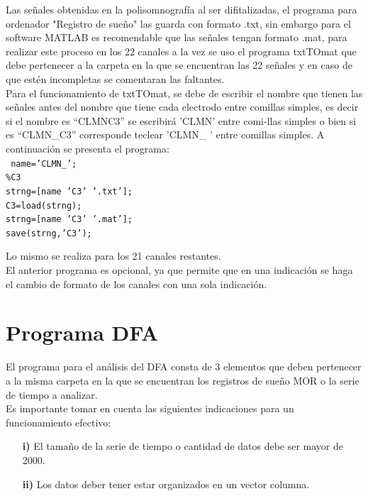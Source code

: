 \documentclass[letterpaper,titlepage,12pt,draft]{report}
\begin{document}
Las se\~nales obtenidas en la polisomnograf\'ia al ser difitalizadas, el programa para ordenador "Registro de sue\~no" las guarda con formato .txt, sin embargo para el software MATLAB es recomendable que las se\~nales tengan formato .mat, para realizar este proceso en los 22 canales a la vez se uso el programa txtTOmat que debe pertenecer a la carpeta en la que se encuentran las 22 se\~nales y en caso de que est\'en incompletas se comentaran las faltantes.\\

Para el funcionamiento de txtTOmat, se debe de escribir el nombre que tienen las se\~nales antes del nombre que tiene cada electrodo entre comillas simples, es decir si el nombre es ``CLMNC3'' se escribir\'a 'CLMN' entre comi-llas simples o bien si es ``CLMN\_C3'' corresponde teclear 'CLMN\_ ' entre comillas simples. A continuaci\'on se presenta el programa:\\

{\tt
\setlength{\parindent}{0pt}name=\textcolor[cmyk]{0,1,0,0}{'CLMN\_'};\\
\%C3\\
strng=[name \textcolor[cmyk]{0,1,0,0}{'C3' '.txt'}];\\
C3=load(strng);\\
strng=[name \textcolor[cmyk]{0,1,0,0}{'C3' '.mat'}];\\
save(strng,\textcolor[cmyk]{0,1,0,0}{'C3'});\\
}

Lo mismo se realiza para los 21 canales restantes.\\

El anterior programa es opcional, ya que permite que en una indicaci\'on se haga el cambio de formato de los canales con una sola indicaci\'on. 

\section{Programa DFA}

El programa para el an\'alisis del DFA consta de 3 elementos que deben pertenecer a la misma carpeta en la que se encuentran los registros de sue\~no MOR o la serie de tiempo a analizar.\\

Es importante tomar en cuenta las siguientes indicaciones para un funcionamiento efectivo:
\begin{enumerate}
\item[\bf i)] El tama\~no de la serie de tiempo o cantidad de datos debe ser mayor de 2000. 
\item[\bf ii)] Los datos deber tener estar organizados en un vector columna.
\end{enumerate}
\end{document}
